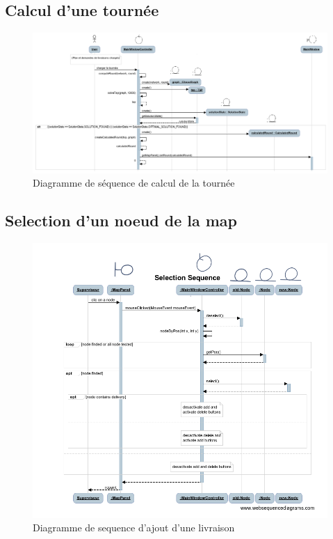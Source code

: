 \begin{landscape}
    \subsection{Calcul d'une tourn\'ee}

    \begin{figure}[h]
        \centering
        \includegraphics[width=240mm]{../diagrams/sequences/computeRound.png}
        \caption{Diagramme de s\'equence de calcul de la tourn\'ee}
        \label{diagram:seq_compute_round}
    \end{figure}
\end{landscape}
\pagebreak

\subsection{Selection d'un noeud de la map}

\begin{figure}[h]
    \centering
    \includegraphics[width=\linewidth]{../diagrams/sequences/selsequence.png}
    \caption{Diagramme de sequence d'ajout d'une livraison}
    \label{diagram:seq_add_delivery}
\end{figure}
\pagebreak

